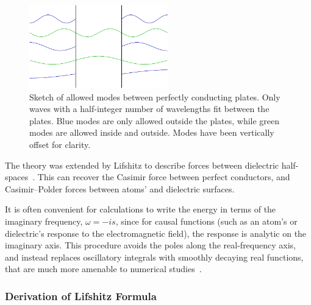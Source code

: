 \begin{figure}
\center
\includegraphics[width=6cm]{fig/intro/twoplanes_wave}
\caption[Allowed modes between parallel plates]
{Sketch of allowed modes between perfectly conducting plates. 
 Only waves with a half-integer number of wavelengths fit between the plates.
Blue modes are only allowed outside the plates, while green modes are allowed inside
and outside.  Modes have been vertically offset for clarity.  }
\label{fig:Casimir_sketch}
\end{figure}

The theory was extended by Lifshitz to describe forces between dielectric half-spaces~\cite{Lifshitz1956,
Dzyaloshinskii1959,Dzyaloshinskii1961}.  This can recover the Casimir force between 
perfect conductors, and Casimir--Polder forces between atoms' and dielectric surfaces.  

It is often convenient for calculations to write the energy in terms of the imaginary frequency, $\omega = -is$,
since for causal functions (such as an atom's or dielectric's response to the electromagnetic field), 
the response is analytic on the imaginary axis.    
This procedure avoids the poles along the real-frequency axis, and instead replaces oscillatory
integrals with smoothly decaying real functions, that are much more amenable to numerical studies~\cite{Johnson2011}.

\subsubsection{Derivation of Lifshitz Formula}

